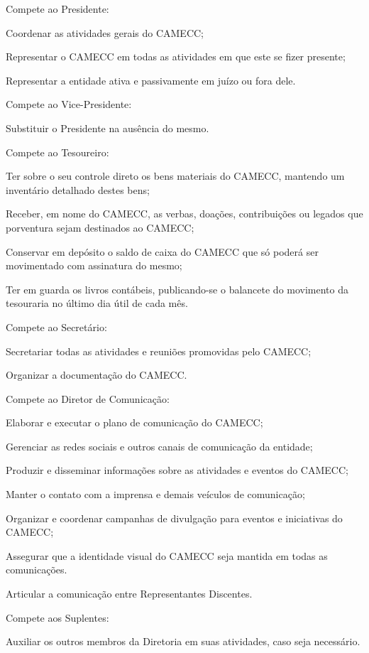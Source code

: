 \documentclass{estatuto}
\begin{document}
\artigo Compete ao Presidente:

\inciso Coordenar as atividades gerais do CAMECC;

\inciso Representar o CAMECC em todas as atividades em que este se fizer presente;

\inciso Representar a entidade ativa e passivamente em juízo ou fora dele.

\artigo Compete ao Vice-Presidente:

\inciso Substituir o Presidente na ausência do mesmo.

\artigo Compete ao Tesoureiro:

\inciso Ter sobre o seu controle direto os bens materiais do CAMECC, mantendo um inventário detalhado destes bens;

\inciso Receber, em nome do CAMECC, as verbas, doações, contribuições ou legados que porventura sejam destinados ao CAMECC;

\inciso Conservar em depósito o saldo de caixa do CAMECC que só poderá ser movimentado com assinatura do mesmo;

\inciso Ter em guarda os livros contábeis, publicando-se o balancete do movimento da tesouraria no último dia útil de cada mês.

\artigo Compete ao Secretário:

\inciso Secretariar todas as atividades e reuniões promovidas pelo CAMECC;

\inciso Organizar a documentação do CAMECC.

\artigo Compete ao Diretor de Comunicação:

\inciso Elaborar e executar o plano de comunicação do CAMECC;

\inciso Gerenciar as redes sociais e outros canais de comunicação da entidade;

\inciso Produzir e disseminar informações sobre as atividades e eventos do CAMECC;

\inciso Manter o contato com a imprensa e demais veículos de comunicação;

\inciso Organizar e coordenar campanhas de divulgação para eventos e iniciativas do CAMECC;

\inciso Assegurar que a identidade visual do CAMECC seja mantida em todas as comunicações.

\inciso Articular a comunicação entre Representantes Discentes.

\artigo Compete aos Suplentes:

\inciso Auxiliar os outros membros da Diretoria em suas atividades, caso seja necessário.
\end{document}
